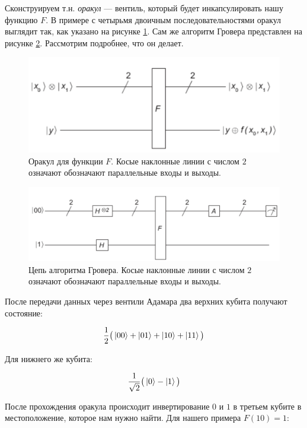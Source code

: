 \documentclass[a4paper, 12pt]{article}
\begin{document}
Сконструируем т.н. \textit{оракул} --- вентиль, который будет инкапсулировать нашу функцию $F$. В примере с четырьмя двоичным последовательностями оракул выглядит так, как указано на рисунке \ref{oracle}. Сам же алгоритм Гровера представлен на рисунке \ref{grover}. Рассмотрим подробнее, что он делает.

\begin{figure}[H]
	\centering
	\includegraphics[width=0.8\linewidth]{Oracle}
	\caption{Оракул для функции $F$. Косые наклонные линии с числом $2$ означают обозначают параллельные входы и выходы.}
	\label{oracle}
\end{figure}

\begin{figure}[H]
	\centering
	\includegraphics[width=0.8\linewidth]{Grover}
	\caption{Цепь алгоритма Гровера. Косые наклонные линии с числом $2$ означают обозначают параллельные входы и выходы.}
	\label{grover}
\end{figure}

После передачи данных через вентили Адамара два верхних кубита получают состояние:

\begin{equation}
	\frac{1}{2}\big(\ket{00} + \ket{01}+ \ket{10} + \ket{11}\big)
\end{equation}

Для нижнего же кубита:

\begin{equation}
	\frac{1}{\sqrt{2}}\big( \ket{0} - \ket{1}\big)
\end{equation}

После прохождения оракула происходит инвертирование $0$ и $1$ в третьем кубите в местоположение, которое нам нужно найти. Для нашего примера $F(10) = 1$:
\end{document}
